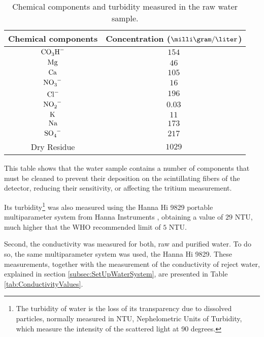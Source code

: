 \begin{table}[htbp]
\begin{center}
\begin{tabular}{|c|c|}
\hline
Chemical components & Concentration ($\milli\gram/\liter$)\\
\hline \hline \hline
$\ce{CO_{3}H^-}$ & $154$ \\ \hline
$\ce{Mg}$ & $46$ \\ \hline
$\ce{Ca}$ & $105$ \\ \hline
$\ce{NO_{3}^-}$ & $16$ \\ \hline
$\ce{Cl^-}$ & $196$ \\ \hline
$\ce{NO_{2}^-}$ & $0.03$ \\ \hline
$\ce{K}$ & $11$ \\ \hline
$\ce{Na}$ & $173$ \\ \hline
$\ce{SO_{4}^-}$ & $217$ \\ \hline
Dry Residue & $1029$ \\ \hline
\end{tabular}
\caption{Chemical components and turbidity measured in the raw water sample.}
\label{tab:ChemicalComponentsRawWater}
\end{center}
\end{table}

This table shows that the water sample contains a number of components that must be cleaned to prevent their deposition on the scintillating fibers of the detector, reducing their sensitivity, or affecting the tritium measurement.

Its turbidity\footnote{The turbidity of water is the loss of its transparency due to dissolved particles, normally measured in NTU, Nephelometric Units of Turbidity, which measure the intensity of the scattered light at 90 degrees.} was also measured using the Hanna Hi 9829 portable multiparameter system from Hanna Instruments \cite{TurbiditySystem}, obtaining a value of $29$ NTU, much higher that the WHO recommended limit of $5$ NTU.

Second, the conductivity was measured for both, raw and purified water. To do so, the same multiparameter system was used, the Hanna Hi 9829. These measurements, together with the measurement of the conductivity of reject water, explained in section \ref{subsec:SetUpWaterSystem}, are presented in Table \ref{tab:ConductivityValues}.

